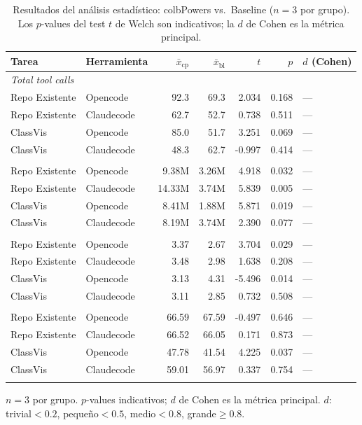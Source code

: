 \usepackage{booktabs}
\usepackage{siunitx}

\begin{table}[ht]
  \centering
  \caption{Resultados del análisis estadístico: colbPowers vs.\ Baseline ($n=3$ por grupo). Los $p$-values del test $t$ de Welch son indicativos; la $d$ de Cohen es la métrica principal.}
  \label{tab:ttest_cpbl}
  \begin{tabular}{llrrrrl}
    \toprule
    Tarea & Herramienta & $\bar{x}_\text{cp}$ & $\bar{x}_\text{bl}$ & $t$ & $p$ & $d$ (Cohen) \\
    \midrule
    \multicolumn{7}{l}{\textit{Total tool calls}} \\
    \quad Repo Existente & Opencode & 92.3 & 69.3 & 2.034 & 0.168 & — \\
    \quad Repo Existente & Claudecode & 62.7 & 52.7 & 0.738 & 0.511 & — \\
    \quad ClassVis & Opencode & 85.0 & 51.7 & 3.251 & 0.069 & — \\
    \quad ClassVis & Claudecode & 48.3 & 62.7 & -0.997 & 0.414 & — \\
    \addlinespace
    \multicolumn{7}{l}{\textit{Total tokens}} \\
    \quad Repo Existente & Opencode & 9.38M & 3.26M & 4.918 & 0.032 & — \\
    \quad Repo Existente & Claudecode & 14.33M & 3.74M & 5.839 & 0.005 & — \\
    \quad ClassVis & Opencode & 8.41M & 1.88M & 5.871 & 0.019 & — \\
    \quad ClassVis & Claudecode & 8.19M & 3.74M & 2.390 & 0.077 & — \\
    \addlinespace
    \multicolumn{7}{l}{\textit{Avg. cyclomatic complexity}} \\
    \quad Repo Existente & Opencode & 3.37 & 2.67 & 3.704 & 0.029 & — \\
    \quad Repo Existente & Claudecode & 3.48 & 2.98 & 1.638 & 0.208 & — \\
    \quad ClassVis & Opencode & 3.13 & 4.31 & -5.496 & 0.014 & — \\
    \quad ClassVis & Claudecode & 3.11 & 2.85 & 0.732 & 0.508 & — \\
    \addlinespace
    \multicolumn{7}{l}{\textit{Maintainability index}} \\
    \quad Repo Existente & Opencode & 66.59 & 67.59 & -0.497 & 0.646 & — \\
    \quad Repo Existente & Claudecode & 66.52 & 66.05 & 0.171 & 0.873 & — \\
    \quad ClassVis & Opencode & 47.78 & 41.54 & 4.225 & 0.037 & — \\
    \quad ClassVis & Claudecode & 59.01 & 56.97 & 0.337 & 0.754 & — \\
    \addlinespace
    \bottomrule
  \end{tabular}
  \begin{tablenotes}
    \small \item $n=3$ por grupo. $p$-values indicativos; $d$ de Cohen es la métrica principal. $d$: trivial${<}0.2$, pequeño${<}0.5$, medio${<}0.8$, grande${\geq}0.8$.
  \end{tablenotes}
\end{table}

